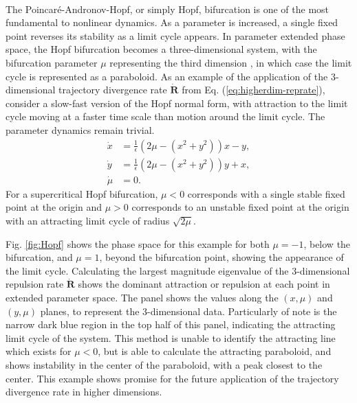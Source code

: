 \documentclass[twocolumn]{svjour3}
\newcommand{\edit}[3]{{\color{red} #2}}
\begin{document}
 \\
The Poincar\'e-Andronov-Hopf, or simply Hopf, bifurcation is one of the most fundamental to nonlinear dynamics. As a parameter is increased, a single fixed point reverses its stability as a limit cycle appears. In parameter extended phase space, the Hopf bifurcation becomes a three-dimensional system, with the bifurcation parameter $\mu$ representing the third dimension \cite{wiggins2003introduction}, in which case the limit cycle is represented as a paraboloid. As an example of the application of the 3-dimensional trajectory divergence rate $\dot{\textbf{R}}$ from Eq. (\ref{eq:higherdim-reprate}), consider a slow-fast version of the Hopf normal form, with attraction to the limit cycle moving at a faster time scale than motion around the limit cycle. The parameter dynamics remain trivial.	
\begin{equation}
\begin{aligned}
\dot{x} &= \frac{1}{\epsilon}\left(2\mu-\left(x^2+y^2\right)\right)x-y, \\
\dot{y} &= \frac{1}{\epsilon}\left(2\mu-\left(x^2+y^2\right)\right)y+x, \\
\dot{\mu} &= 0.
\end{aligned}
\label{eq:Hopf}
\end{equation}
For a supercritical Hopf bifurcation, $\mu<0$ corresponds with a single stable fixed point at the origin and $\mu>0$ corresponds to an unstable fixed point at the origin with an attracting limit cycle of radius $\sqrt{2\mu}$.

Fig. \ref{fig:Hopf} shows the phase space for this example for both $\mu=-1$, below the bifurcation, and $\mu=1$, beyond the bifurcation point, showing the appearance of the limit cycle. Calculating the largest magnitude eigenvalue of the 3-dimensional repulsion rate $\dot{\mathbf{R}}$ shows the dominant attraction or repulsion at each point in extended parameter space. The panel shows the values along the $(x,\mu)$ and \edit{$(y,mu)$}{$(y,\mu)$}{26} planes, to represent the 3-dimensional data. Particularly of note is the narrow dark blue region in the top half of this panel, indicating the attracting limit cycle of the system. This method is unable to identify the attracting line which exists for $\mu<0$, but is able to calculate the attracting paraboloid, and shows instability in the center of the paraboloid, with a peak closest to the center. This example shows promise for the future application of the trajectory divergence rate in higher dimensions.
\end{document}
